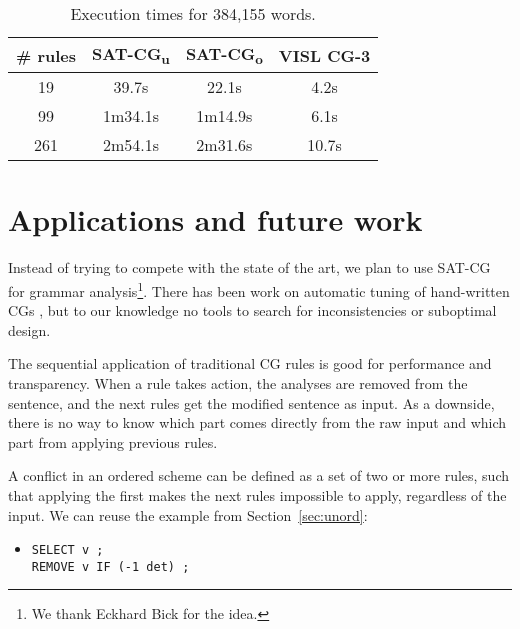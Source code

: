 \begin{table}
  \centering
  \begin{tabular}{|c|c|c|c|}
     \hline
     \textbf{\# rules} &  \textbf{SAT-CG\textsubscript{u}} & \textbf{SAT-CG\textsubscript{o}} & \textbf{VISL CG-3} \\ \hline
      19   & 39.7s &  22.1s   & 4.2s\\ %
      99   & 1m34.1s & 1m14.9s & 6.1s \\ %
      261  & 2m54.1s & 2m31.6s & 10.7s \\ \hline
  \end{tabular}
  \caption{Execution times for 384,155 words.}
  \label{table:time}
\end{table}

\section{Applications and future work}
\label{sec:apps}
Instead of trying to compete with the state of the art, we plan to use SAT-CG for grammar analysis\footnote{We thank Eckhard Bick for the idea.}.
There has been work on automatic tuning of hand-written CGs
\cite{bick2013tuning}, but to our knowledge no tools to
search for inconsistencies or suboptimal design. %

The sequential application of traditional CG rules is good for
performance and transparency. When a rule takes action, the analyses
are removed from the sentence, and the next rules get the modified
sentence as input. 
As a downside, there is no way to know which part comes directly from the
raw input and which part from applying previous rules.

A conflict in an ordered scheme can be defined as 
a set of two or more rules, such that applying the first makes the
next rules impossible to apply, regardless of the input.
We can reuse the example from Section~\ref{sec:unord}:

\begin{itemize}
\item [] \texttt{SELECT v ;} \\
         \texttt{REMOVE v IF (-1 det) ;}
\end{itemize}

